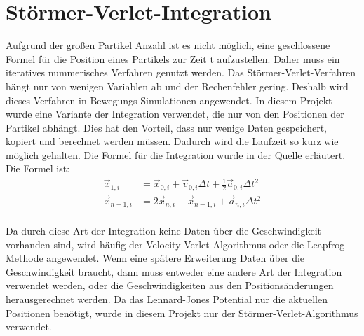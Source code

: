 \documentclass[
12pt,
a4paper,
BCOR10mm,
DIV14,
headsepline,
]{scrreprt}
\begin{document}
	\section{Störmer-Verlet-Integration}%
	Aufgrund der großen Partikel Anzahl ist es nicht möglich, eine geschlossene Formel für die Position eines Partikels zur Zeit t aufzustellen. Daher muss ein iteratives nummerisches Verfahren genutzt werden. Das Störmer-Verlet-Verfahren hängt nur von wenigen Variablen ab und der Rechenfehler gering. Deshalb wird dieses Verfahren in Bewegungs-Simulationen angewendet. In diesem Projekt wurde eine Variante der Integration verwendet, die nur von den Positionen der Partikel abhängt. Dies hat den Vorteil, dass nur wenige Daten gespeichert, kopiert und berechnet werden müssen. Dadurch wird die Laufzeit so kurz wie möglich gehalten. Die Formel für die Integration wurde in der Quelle \cite{VerletAlgorithmusWiki} erläutert. Die Formel ist:
	\begin{align*}
	\vec{x}_{1,i}&=\vec{x}_{0,i}+\vec{v}_{0,i}\Delta t+\frac{1}{2}\vec{a}_{0,i}\Delta t^2\\
	\vec{x}_{n+1,i}&=2\vec{x}_{n,i}-\vec{x}_{n-1,i}+\vec{a}_{n,i}\Delta t^2
	\end{align*}\\
	Da durch diese Art der Integration keine Daten über die Geschwindigkeit vorhanden sind, wird häufig der Velocity-Verlet Algorithmus oder die Leapfrog Methode angewendet. Wenn eine spätere Erweiterung Daten über die Geschwindigkeit braucht, dann muss entweder eine andere Art der Integration verwendet werden, oder die Geschwindigkeiten aus den Positionsänderungen herausgerechnet werden. Da das Lennard-Jones Potential nur die aktuellen Positionen benötigt, wurde in diesem Projekt nur der Störmer-Verlet-Algorithmus verwendet.
	\newpage
\end{document}
